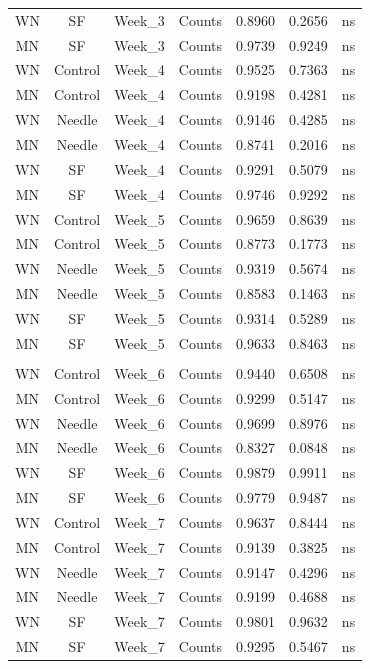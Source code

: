 \documentclass[
  12pt,
  letterpaper,
]{article}
\begin{document}
\begin{longtable}{ccclrrl}
WN & SF & Week\_3 & Counts & 0.8960 & 0.2656 & ns \\ 
MN & SF & Week\_3 & Counts & 0.9739 & 0.9249 & ns \\ 
WN & Control & Week\_4 & Counts & 0.9525 & 0.7363 & ns \\ 
MN & Control & Week\_4 & Counts & 0.9198 & 0.4281 & ns \\ 
WN & Needle & Week\_4 & Counts & 0.9146 & 0.4285 & ns \\ 
MN & Needle & Week\_4 & Counts & 0.8741 & 0.2016 & ns \\ 
WN & SF & Week\_4 & Counts & 0.9291 & 0.5079 & ns \\ 
MN & SF & Week\_4 & Counts & 0.9746 & 0.9292 & ns \\ 
WN & Control & Week\_5 & Counts & 0.9659 & 0.8639 & ns \\ 
MN & Control & Week\_5 & Counts & 0.8773 & 0.1773 & ns \\ 
WN & Needle & Week\_5 & Counts & 0.9319 & 0.5674 & ns \\ 
MN & Needle & Week\_5 & Counts & 0.8583 & 0.1463 & ns \\ 
WN & SF & Week\_5 & Counts & 0.9314 & 0.5289 & ns \\ 
MN & SF & Week\_5 & Counts & 0.9633 & 0.8463 & ns \\ 
\midrule\addlinespace[2.5pt]
\multicolumn{7}{l}{Post-Infestion} \\ 
\midrule\addlinespace[2.5pt]
WN & Control & Week\_6 & Counts & 0.9440 & 0.6508 & ns \\ 
MN & Control & Week\_6 & Counts & 0.9299 & 0.5147 & ns \\ 
WN & Needle & Week\_6 & Counts & 0.9699 & 0.8976 & ns \\ 
MN & Needle & Week\_6 & Counts & 0.8327 & 0.0848 & ns \\ 
WN & SF & Week\_6 & Counts & 0.9879 & 0.9911 & ns \\ 
MN & SF & Week\_6 & Counts & 0.9779 & 0.9487 & ns \\ 
WN & Control & Week\_7 & Counts & 0.9637 & 0.8444 & ns \\ 
MN & Control & Week\_7 & Counts & 0.9139 & 0.3825 & ns \\ 
WN & Needle & Week\_7 & Counts & 0.9147 & 0.4296 & ns \\ 
MN & Needle & Week\_7 & Counts & 0.9199 & 0.4688 & ns \\ 
WN & SF & Week\_7 & Counts & 0.9801 & 0.9632 & ns \\ 
MN & SF & Week\_7 & Counts & 0.9295 & 0.5467 & ns \\ 

\end{longtable}
\end{document}
